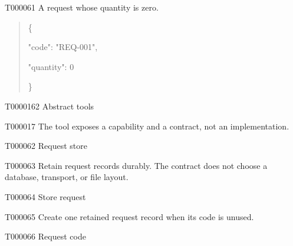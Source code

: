 \documentclass[11pt,a4paper]{article}
\begin{document}
\begin{atlasparagraph}{T000061}
A request whose quantity is zero.
\end{atlasparagraph}
\par\noindent\begin{minipage}{\linewidth}
\begin{quote}\small\ttfamily\raggedright
\noindent \{\par
\noindent   "code":\allowbreak{} "REQ-\allowbreak{}001",\par
\noindent   "quantity":\allowbreak{} 0\par
\noindent \}\par
\end{quote}
\end{minipage}\par
{}
\begin{atlasheading}{T000016}{2}
Abstract tools
\end{atlasheading}
\begin{atlasparagraph}{T000017}
The tool exposes a capability and a contract, not an implementation.
\end{atlasparagraph}
\begin{atlastext}{T000062}
Request store
\end{atlastext}
\begin{atlasparagraph}{T000063}
Retain request records durably. The contract does not choose a database, transport, or file layout.
\end{atlasparagraph}
\begin{atlastext}{T000064}
Store request
\end{atlastext}
\begin{atlasparagraph}{T000065}
Create one retained request record when its code is unused.
\end{atlasparagraph}
\begin{atlastext}{T000066}
Request code
\end{atlastext}
\end{document}
